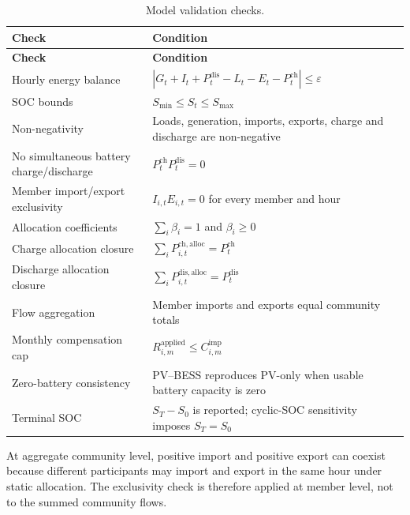 \begin{longtable}{p{}p{}}
\caption{Model validation checks.}\label{tab:ch4_validation_checks}\\
\toprule
\textbf{Check} & \textbf{Condition} \\
\midrule
\endfirsthead
\toprule
\textbf{Check} & \textbf{Condition} \\
\midrule
\endhead
Hourly energy balance & $\left|G_t+I_t+P^{\mathrm{dis}}_t-L_t-E_t-P^{\mathrm{ch}}_t\right|\leq\varepsilon$ \\
SOC bounds & $S_{\min}\leq S_t\leq S_{\max}$ \\
Non-negativity & Loads, generation, imports, exports, charge and discharge are non-negative \\
No simultaneous battery charge/discharge & $P^{\mathrm{ch}}_tP^{\mathrm{dis}}_t=0$ \\
Member import/export exclusivity & $I_{i,t}E_{i,t}=0$ for every member and hour \\
Allocation coefficients & $\sum_i\beta_i=1$ and $\beta_i\geq0$ \\
Charge allocation closure & $\sum_iP^{\mathrm{ch,alloc}}_{i,t}=P^{\mathrm{ch}}_t$ \\
Discharge allocation closure & $\sum_iP^{\mathrm{dis,alloc}}_{i,t}=P^{\mathrm{dis}}_t$ \\
Flow aggregation & Member imports and exports equal community totals \\
Monthly compensation cap & $R^{\mathrm{applied}}_{i,m}\leq C^{\mathrm{imp}}_{i,m}$ \\
Zero-battery consistency & PV--BESS reproduces PV-only when usable battery capacity is zero \\
Terminal SOC & $S_T-S_0$ is reported; cyclic-SOC sensitivity imposes $S_T=S_0$ \\
\bottomrule
\end{longtable}

At aggregate community level, positive import and positive export can coexist because different participants may import and export in the same hour under static allocation. The exclusivity check is therefore applied at member level, not to the summed community flows.
